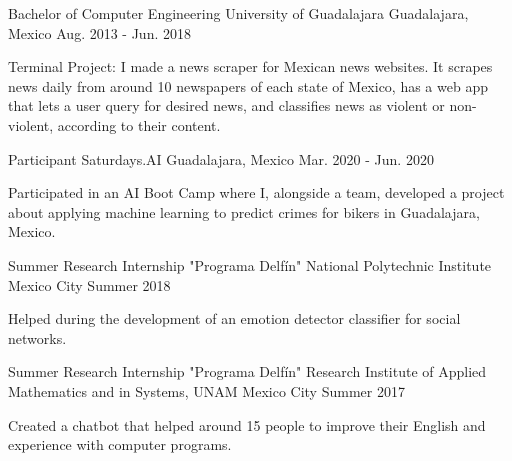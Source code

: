 

\begin{cventries}

  \cventry
    {Bachelor of Computer Engineering} %
    {University of Guadalajara} %
    {Guadalajara, Mexico} %
    {Aug. 2013 - Jun. 2018} %
    {
      \begin{cvitems} %
        \item {Terminal Project: I made a news scraper for Mexican news websites. It scrapes news daily from around 10 newspapers of each state of Mexico, has a web app that lets a user query for desired news, and classifies news as violent or non-violent, according to their content.}
      \end{cvitems}
    }
    
  \cventry
    {Participant} %
    {Saturdays.AI} %
    {Guadalajara, Mexico} %
    {Mar. 2020 - Jun. 2020} %
    {
      \begin{cvitems} %
        \item {Participated in an AI Boot Camp where I, alongside a team, developed a project about applying machine learning to predict crimes for bikers in Guadalajara, Mexico.}
      \end{cvitems}
    }
    
  \cventry
    {Summer Research Internship "Programa Delfín"} %
    {National Polytechnic Institute} %
    {Mexico City} %
    {Summer 2018} %
    {
      \begin{cvitems} %
        \item {Helped during the development of an emotion detector classifier for social networks.}
      \end{cvitems}
    }
    
  \cventry
    {Summer Research Internship "Programa Delfín"} %
    {Research Institute of Applied Mathematics and in Systems, UNAM} %
    {Mexico City} %
    {Summer 2017} %
    {
      \begin{cvitems} %
        \item {Created a chatbot that helped around 15 people to improve their English and experience with computer programs.}
      \end{cvitems}
    }

\end{cventries}
